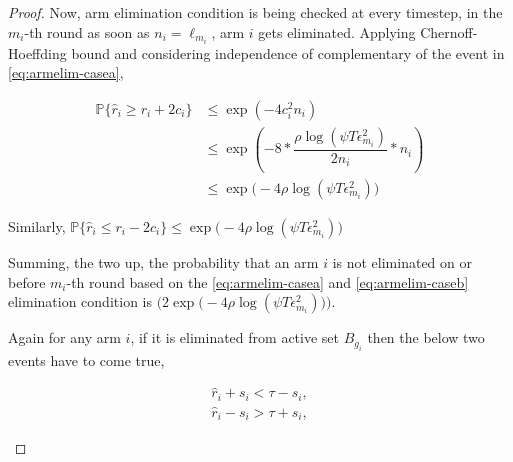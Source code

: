 \begin{proof}
Now, arm elimination condition is being checked at every timestep, in the $m_{i}$-th round as soon as $n_{i}=\ell_{m_{i}}$, arm $i$ gets eliminated. Applying Chernoff-Hoeffding bound and considering independence of complementary of the event in \ref{eq:armelim-casea},
\begin{small}
\begin{align*}
\mathbb{P}\lbrace\hat{r}_{i}\geq r_{i} + 2c_{i}\rbrace &\leq \exp(-4 c_{i}^{2}n_{i})\\
&\leq \exp(-8 * \dfrac{\rho\log (\psi T\epsilon_{m_{i}}^{2})}{2 n_{i}} *n_{i})\\
&\leq \exp\big(-4\rho\log (\psi T\epsilon_{m_{i}}^{2})\big)
\end{align*}
\end{small}
  
  

Similarly, $\mathbb{P}\lbrace\hat{r}_{i}\leq r_{i} - 2c_{i}\rbrace\leq \exp\big(-4\rho\log (\psi T\epsilon_{m_{i}}^{2})\big)$
 

Summing, the two up, the probability that an arm ${i}$ is not eliminated on or before $m_{i}$-th round based on the \ref{eq:armelim-casea} and \ref{eq:armelim-caseb} elimination condition is  $\big(2\exp\big(-4\rho\log (\psi T\epsilon_{m_{i}}^{2})\big)\big)$. 


Again for any arm $i$, if it is eliminated from active set $B_{g_{i}}$ then the below two events have to come true,
\begin{small}
\begin{align}
\hat{r}_{i} + s_{i} < \tau - s_{i}, \label{eq:armelim-var-casea}\\
\hat{r}_{i} - s_{i} > \tau + s_{i}, \label{eq:armelim-var-caseb}
\end{align}
\end{small}


\end{proof}
